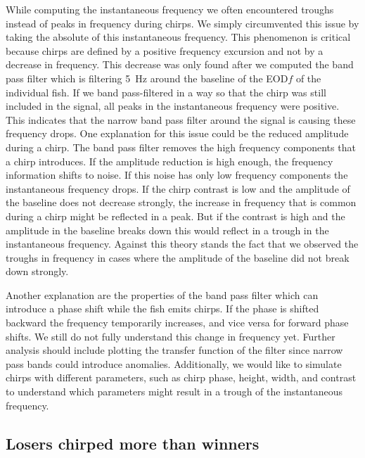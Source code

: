 While computing the instantaneous frequency we often encountered troughs instead of peaks in frequency during chirps. We simply circumvented this issue by taking the absolute of this instantaneous frequency. This phenomenon is critical because chirps are defined by a positive frequency excursion and not by a decrease in frequency. This decrease was only found after we computed the band pass filter which is filtering \SI{5}{\hertz} around the baseline of the EOD$f$ of the individual fish. If we band pass-filtered in a way so that the chirp was still included in the signal, all peaks in the instantaneous frequency were positive. This indicates that the narrow band pass filter around the signal is causing these frequency drops. One explanation for this issue could be the reduced amplitude during a chirp. The band pass filter removes the high frequency components that a chirp introduces. If the amplitude reduction is high enough, the frequency information shifts to noise.  If this noise has only low frequency components the instantaneous frequency drops. If the chirp contrast is low and the amplitude of the baseline does not decrease strongly, the increase in frequency that is common during a chirp might be reflected in a peak. But if the contrast is high and the amplitude in the baseline breaks down this would reflect in a trough in the instantaneous frequency. Against this theory stands the fact that we observed the troughs in frequency in cases where the amplitude of the baseline did not break down strongly. 

\vspace{\baselineskip}

Another explanation are the properties of the band pass filter which can introduce a phase shift while the fish emits chirps. If the phase is shifted backward the frequency temporarily increases, and vice versa for forward phase shifts. We still do not fully understand this change in frequency yet. Further analysis should include plotting the transfer function of the filter since narrow pass bands could introduce anomalies. Additionally, we would like to simulate chirps with different parameters, such as chirp phase, height, width, and contrast to understand which parameters might result in a trough of the instantaneous frequency.

\subsection{Losers chirped more than winners}

